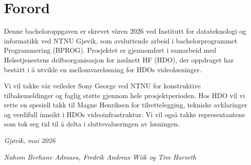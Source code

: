 \chapter*{Forord}

Denne bacheloroppgaven er skrevet våren 2026 ved Institutt for 
datateknologi og informatikk ved NTNU Gjøvik, som avsluttende arbeid 
i bachelorprogrammet Programmering (BPROG). Prosjektet er gjennomført 
i samarbeid med Helsetjenestens driftsorganisasjon for nødnett HF 
(HDO), der oppdraget har bestått i å utvikle en mellomvareløsning 
for HDOs videoløsninger.

Vi vil takke vår veileder Sony George ved NTNU for konstruktive 
tilbakemeldinger og faglig støtte gjennom hele prosjektperioden. 
Hos HDO vil vi rette en spesiell takk til Magne Henriksen for 
tilrettelegging, tekniske avklaringer og verdifull innsikt i HDOs 
videoinfrastruktur. Vi vil også takke representantene som tok seg 
tid til å delta i sluttevalueringen av løsningen.

\vspace{1em}
\textit{Gjøvik, mai 2026}

\textit{Nahom Berhane Admasu, Fredrik Andreas Wiik og Tim Harseth}